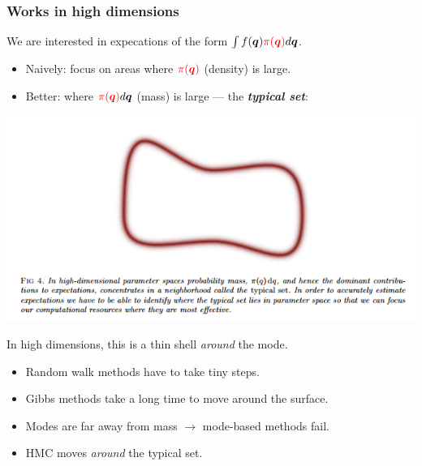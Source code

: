 \documentclass[xcolor=dvipsnames]{beamer}
\begin{document}
\begin{frame}
\frametitle{Works in high dimensions}
We are interested in expecations of the form $\int f(\bm{q}){\color{red}\pi(\bm{q})}d\bm{q}$.
\begin{itemize}
\item Naively: focus on areas where ${\color{red}\pi(\bm{q})}$ (density) is large.
\item Better: where ${\color{red}\pi(\bm{q})}d\bm{q}$ (mass) is large --- the \emph{\textbf{\color{red} typical set}}:
\end{itemize}
\begin{center}
\includegraphics[height=0.4\textheight]{typicalset.png}
\end{center}
In high dimensions, this is a thin shell \emph{around} the mode.
\begin{itemize}
\item Random walk methods have to take tiny steps.
\item Gibbs methods take a long time to move around the surface.
\item Modes are far away from mass $\to$ mode-based methods fail.
\item HMC moves \emph{around} the typical set.
\end{itemize}
\end{frame}
\end{document}
